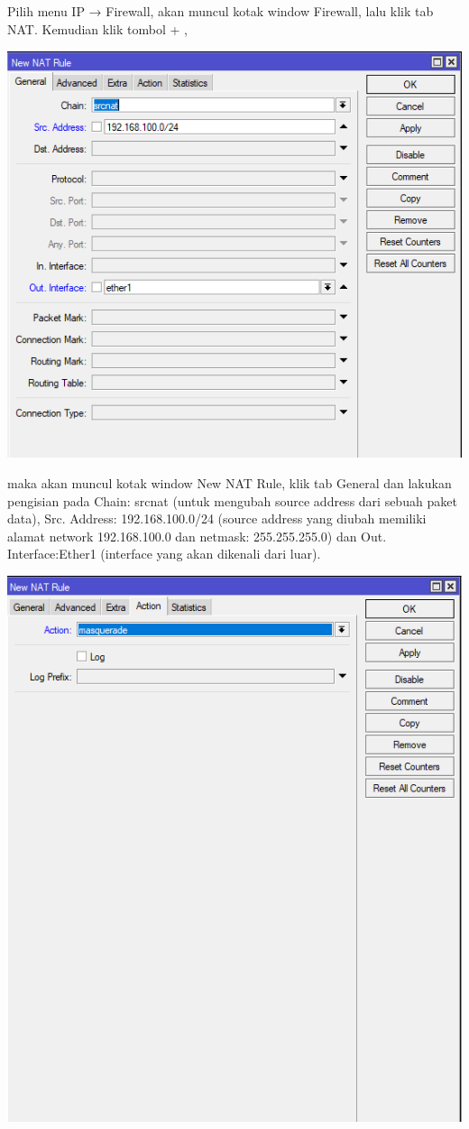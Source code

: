 \documentclass[a4paper,12pt]{article}
\begin{document}
\begin{enumerate}
	Pilih menu IP → Firewall, akan muncul kotak window Firewall, lalu klik tab NAT.	
	Kemudian klik tombol + , 
	\begin{center}
		\includegraphics[scale=.8]{Capture13}
	\end{center}
	maka akan muncul kotak window New NAT Rule, klik tab General dan lakukan pengisian pada Chain: srcnat (untuk mengubah source address dari sebuah paket data), Src. Address: 192.168.100.0/24 (source address yang diubah memiliki alamat network 192.168.100.0 dan netmask: 255.255.255.0) dan Out. Interface:Ether1 (interface yang akan dikenali dari luar).	
	\begin{center}
		\includegraphics[scale=.5]{Capture14}

\end{center}
\end{enumerate}
\end{document}
